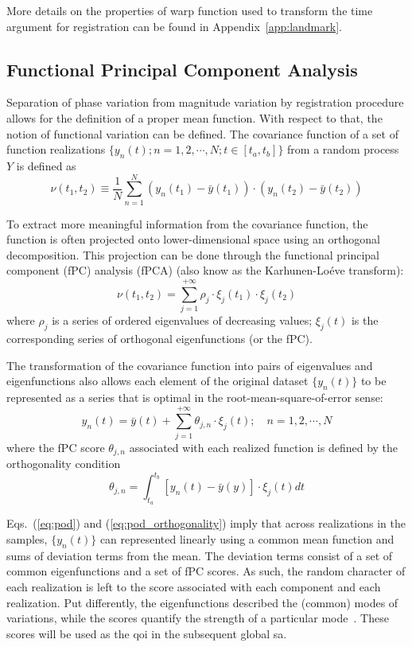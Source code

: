 More details on the properties of warp function used to transform the time argument for registration can be found in Appendix~\ref{app:landmark}.

\subsection{Functional Principal Component Analysis}\label{sub:sa_fpca}

Separation of phase variation from magnitude variation by registration procedure allows for the definition of a proper mean function.
With respect to that, the notion of functional variation can be defined.
The covariance function of a set of function realizations $\{y_n(t);n = 1, 2, \cdots, N; t \in [t_a,t_b]\}$ from a random process $Y$ is defined as
\begin{equation}
	\nu (t_1, t_2) \equiv \frac{1}{N} \sum_{n=1}^{N} (y_n(t_1) - \bar{y}(t_1)) \cdot (y_n(t_2) - \bar{y}(t_2))
\label{eq:covariance_function}
\end{equation}

To extract more meaningful information from the covariance function, the function is often projected onto lower-dimensional space using an orthogonal decomposition.
This projection can be done through the functional principal component (fPC) analysis (fPCA) (also know as the Karhunen-Lo\'eve transform):
\begin{equation}
	\nu (t_1, t_2) = \sum_{j=1}^{+\infty} \rho_j \cdot \xi_j(t_1) \cdot \xi_j(t_2)
\label{eq:kl_transform}
\end{equation}
where $\rho_j$ is a series of ordered eigenvalues of decreasing values; 
$\xi_j(t)$ is the corresponding series of orthogonal eigenfunctions (or the fPC).

The transformation of the covariance function into pairs of eigenvalues and eigenfunctions also allows each element of the original dataset $\{y_n(t)\}$ to be represented as a series that is optimal in the root-mean-square-of-error sense:
\begin{equation}
  y_n(t) = \bar{y}(t) + \sum_{j=1}^{+\infty} \theta_{j,n} \cdot \xi_j (t); \quad n = 1, 2, \cdots, N
\label{eq:pod}
\end{equation}
where the fPC score $\theta_{j,n}$ associated with each realized function is defined by the orthogonality condition
\begin{equation}
  \theta_{j,n} = \int_{t_a}^{t_b} \left[y_n(t) - \bar{y}(y)\right] \cdot \xi_j (t) dt
\label{eq:pod_orthogonality}
\end{equation}

Eqs.~(\ref{eq:pod}) and (\ref{eq:pod_orthogonality}) imply that across realizations in the samples, 
$\{y_n(t)\}$ can represented linearly using a common mean function and sums of deviation terms from the mean.
The deviation terms consist of a set of common eigenfunctions and a set of fPC scores.
As such, the random character of each realization is left to the score associated with each component and each realization.
Put differently, the eigenfunctions described the (common) modes of variations, 
while the scores quantify the strength of a particular mode~\cite{Wang2012}.
These scores will be used as the \gls{qoi} in the subsequent global \gls{sa}.